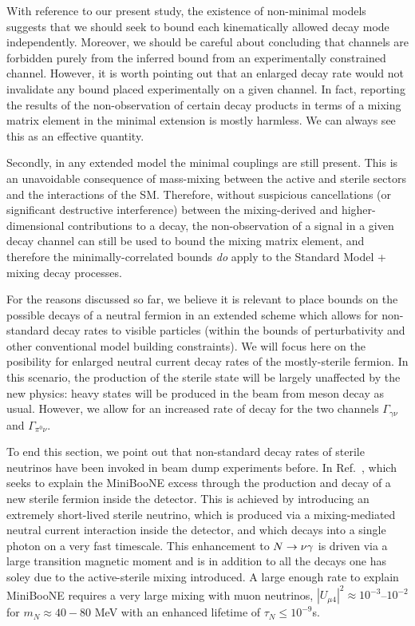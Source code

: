 \documentclass[11pt, a4paper]{article}
\newcommand{\refref}[1]{Ref.~\cite{#1}}
\def\ster{\ensuremath N}
\begin{document}
With reference to our present study, the existence of non-minimal models
suggests that we should seek to bound each kinematically allowed decay mode
independently. Moreover, we should be careful about concluding that channels
are forbidden purely from the inferred bound from an experimentally constrained
channel.  
%
However, it is worth pointing out that an enlarged decay rate would not
invalidate any bound placed experimentally on a given channel. In fact,
reporting the results of the non-observation of certain decay products in terms
of a mixing matrix element in the minimal extension is mostly harmless. We can
always see this as an effective quantity. 

Secondly, in any extended model the minimal couplings are still present. This
is an unavoidable consequence of mass-mixing between the active and sterile
sectors and the interactions of the SM. Therefore, without suspicious
cancellations (or significant destructive interference) between the
mixing-derived and higher-dimensional contributions to a decay, the
non-observation of a signal in a given decay channel can still be used to bound
the mixing matrix element, and therefore the minimally-correlated bounds
\emph{do} apply to the Standard Model + mixing decay processes. 

For the reasons discussed so far, we believe it is relevant to place bounds on
the possible decays of a neutral fermion in an extended scheme which allows for
non-standard decay rates to visible particles (within the bounds of perturbativity
and other conventional model building constraints).
%
We will focus here on the posibility for enlarged neutral current decay rates
of the mostly-sterile fermion. In this scenario, the production of the sterile
state will be largely unaffected by the new physics: heavy states will be
produced in the beam from meson decay as usual. However, we allow for an
increased rate of decay for the two channels $\Gamma_{\gamma\nu}$ and
$\Gamma_{\pi^0\nu}$. 

To end this section, we point out that non-standard decay rates of sterile
neutrinos have been invoked in beam dump experiments before. In
\refref{Gninenko:2009ks,Gninenko:2010pr}, which seeks to explain the MiniBooNE
excess through the production and decay of a new sterile fermion inside the
detector. This is achieved by introducing an extremely short-lived sterile
neutrino, which is produced via a mixing-mediated neutral current interaction
inside the detector, and which decays into a single photon on a very fast
timescale. This enhancement to $\ster\to \nu \gamma$ is driven via a large
transition magnetic moment and is in addition to all the decays one has soley
due to the active-sterile mixing introduced. A large enough rate to explain
MiniBooNE requires a very large mixing with muon neutrinos, $|U_{\mu 4}|^2
\approx 10^{-3}$--$10^{-2}$  for $m_N \approx 40-80$ MeV with an enhanced
lifetime of $\tau_N \leq 10^{-9}$s.
\end{document}
